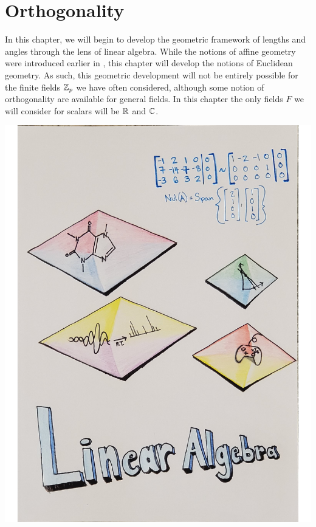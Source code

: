 \chapter{Orthogonality}\label{chap:ortho}
In this chapter, we will begin to develop the geometric framework of lengths and angles through the lens of linear algebra. While the notions of affine geometry were introduced earlier in , this chapter will develop the notions of Euclidean geometry. As such, this geometric development will not be entirely possible for the finite fields $\mathbb{Z}_p$ we have often considered, although some notion of orthogonality are available for general fields. In this chapter the only fields $F$ we will consider for scalars will be $\mathbb{R}$ and $\mathbb{C}$. \\

\begin{center}
\includegraphics[scale=0.75, trim = 40 255 29 45, clip]{Chapter4/images/Chapter4cover.pdf}%
\end{center}
